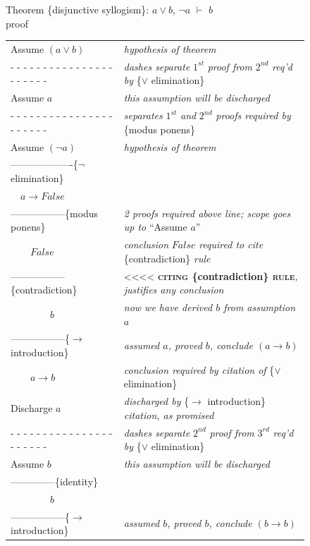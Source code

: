 {{\begin{figure}
Theorem \{disjunctive syllogism\}: $a \vee b$, $\neg a$ $\vdash$ $b$ \\
proof
\begin{center}
\begin{tabular}{ll}
Assume $(a \vee b)$          &\emph{hypothesis of theorem}\\
 - - - - - - - - - - - - - - - - - - - - - -&\emph{dashes separate} $1^{st}$ \emph{proof from} $2^{nd}$ \emph{req'd by} \{$\vee$ elimination\}\\
Assume $a$          & \emph{this assumption will be discharged}\\
 - - - - - - - - - - - - - - - - - - - - - -& \emph{separates} $1^{st}$ \emph{and} $2^{nd}$ \emph{proofs required by} \{modus ponens\} \\
Assume $(\neg a)$        & \emph{hypothesis of theorem}\\
-------------------\{$\neg$ elimination\} \\
~~$a \rightarrow False$ &\\
-----------------\{modus ponens\} &\emph{2 proofs required above line; scope goes up to} ``Assume $a$''\\
~~~~$False$            &\emph{conclusion} $False$ \emph{required to cite} \{contradiction\} \emph{rule}\\
-----------------\{contradiction\} &<<<< \textbf{\textsc{citing} \{contradiction\} \textsc{rule}}\emph{, justifies any conclusion}\\
~~~~~~~~$b$              &\emph{now we have derived $b$ from assumption $a$}\\
-----------------\{$\rightarrow$ introduction\} & \emph{assumed $a$, proved $b$, conclude $(a \rightarrow b)$}\\
~~~~$a \rightarrow b$ &\emph{conclusion required by citation of} \{$\vee$ elimination\} \\
Discharge $a$    &\emph{discharged by} \{$\rightarrow$ introduction\} \emph{citation, as promised}\\
 - - - - - - - - - - - - - - - - - - - - - -&\emph{dashes separate} $2^{nd}$ \emph{proof from} $3^{rd}$ \emph{req'd by} \{$\vee$ elimination\}\\
Assume $b$          &\emph{this assumption will be discharged}\\
--------------\{identity\} &\\
~~~~~~~~$b$          &\\
-----------------\{$\rightarrow$ introduction\} &\emph{assumed $b$, proved $b$, conclude $(b \rightarrow b)$}\\

\end{tabular}
\end{center}
\end{figure}}}
